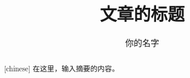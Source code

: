 \documentclass{ecust_thesis_translation}
\title{文章的标题}
\author{你的名字}
\begin{document}
\maketitle
\begin{abstract}[chinese]
在这里，输入摘要的内容。
\end{abstract}
\end{document}
